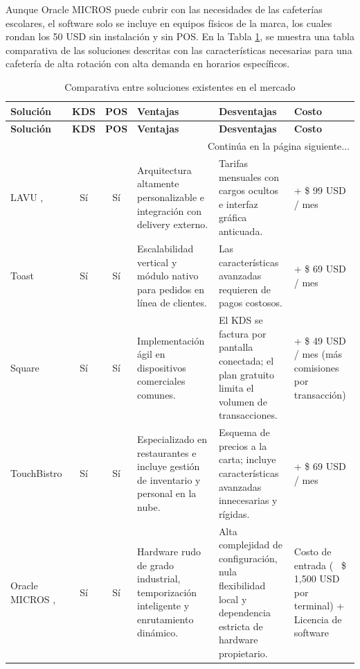 Aunque Oracle MICROS puede cubrir con las necesidades de las cafeterías escolares, el software solo se incluye en equipos físicos de la marca, los cuales rondan los 50 USD \cite{micros2026pos} sin instalación y sin POS. En la Tabla \ref{tab:comparativa-soluciones-existentes}, se muestra una tabla comparativa de las soluciones descritas con las características necesarias para una cafetería de alta rotación con alta demanda en horarios específicos.

\begingroup
\setlength{\LTleft}{\fill}
\setlength{\LTright}{\fill}

\begin{longtable}[c]{l c c p{3cm} p{3cm} p{2cm}}
\caption{Comparativa entre soluciones existentes en el mercado} \label{tab:comparativa-soluciones-existentes} \\
\toprule
\textbf{Solución} & \textbf{KDS} & \textbf{POS} & \textbf{Ventajas} & \textbf{Desventajas} & \textbf{Costo} \\
\midrule
\endfirsthead

\toprule
\textbf{Solución} & \textbf{KDS} & \textbf{POS} & \textbf{Ventajas} & \textbf{Desventajas} & \textbf{Costo} \\
\midrule
\endhead

\midrule
\multicolumn{6}{r}{\small Continúa en la página siguiente...} \\
\endfoot
\bottomrule
\endlastfoot

LAVU \cite{lavu2026demo}, \cite{lavu2025kds} & Sí & Sí & Arquitectura altamente personalizable e integración con delivery externo. & Tarifas mensuales con cargos ocultos e interfaz gráfica anticuada. & + \$ 99 USD / mes  \\
\addlinespace
Toast \cite{toast2026opciones} & Sí & Sí & Escalabilidad vertical y módulo nativo para pedidos en línea de clientes. & Las características avanzadas requieren de pagos costosos. & + \$ 69 USD / mes \\
\addlinespace
Square \cite{block2026square} & Sí & Sí & Implementación ágil en dispositivos comerciales comunes. & El KDS se factura por pantalla conectada; el plan gratuito limita el volumen de transacciones. & + \$ 49 USD / mes (más comisiones por transacción)  \\
\addlinespace
TouchBistro \cite{touchbistro2026pricing} & Sí & Sí & Especializado en restaurantes e incluye gestión de inventario y personal en la nube. & Esquema de precios a la carta; incluye características avanzadas innecesarias y rígidas. & + \$ 69 USD / mes  \\
\addlinespace
Oracle MICROS \cite{oracle2020micros}, \cite{micros2026pos} & Sí & Sí & Hardware rudo de grado industrial, temporización inteligente y enrutamiento dinámico. & Alta complejidad de configuración, nula flexibilidad local y dependencia estricta de hardware propietario. & Costo de entrada (~ \$ 1,500 USD por terminal) + Licencia de software \\
\end{longtable}
\endgroup

